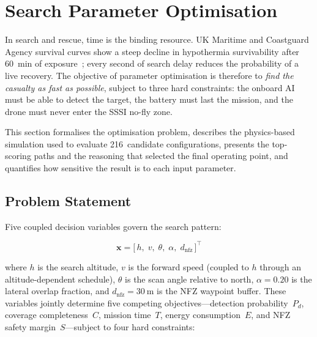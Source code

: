 %

\section{Search Parameter Optimisation}\label{sec:optimisation}

In search and rescue, time is the binding resource.
UK Maritime and Coastguard Agency survival curves show a steep decline in hypothermia survivability after \SI{60}{\minute} of exposure~\cite{golden2006hypothermia}; every second of search delay reduces the probability of a live recovery.
The objective of parameter optimisation is therefore to \emph{find the casualty as fast as possible}, subject to three hard constraints: the onboard AI must be able to detect the target, the battery must last the mission, and the drone must never enter the SSSI no-fly zone.

This section formalises the optimisation problem, describes the physics-based simulation used to evaluate 216~candidate configurations, presents the top-scoring paths and the reasoning that selected the final operating point, and quantifies how sensitive the result is to each input parameter.

\subsection{Problem Statement}\label{sec:opt-objective}

Five coupled decision variables govern the search pattern:

\begin{equation}\label{eq:opt-decision}
  \mathbf{x} = \bigl[\, h,\; v,\; \theta,\; \alpha,\; d_{\mathrm{nfz}} \,\bigr]^\top
\end{equation}

\noindent where $h$ is the search altitude, $v$ is the forward speed (coupled to $h$ through an altitude-dependent schedule), $\theta$ is the scan angle relative to north, $\alpha = 0.20$ is the lateral overlap fraction, and $d_{\mathrm{nfz}} = \SI{30}{\metre}$ is the NFZ waypoint buffer.
These variables jointly determine five competing objectives---detection probability~$P_d$, coverage completeness~$C$, mission time~$T$, energy consumption~$E$, and NFZ safety margin~$S$---subject to four hard constraints:

